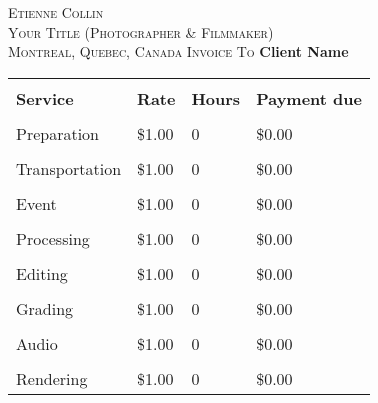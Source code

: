 \documentclass[6pt]{letter}
\newcommand{\authorLocation}{Montreal, Quebec, Canada}
\newcommand{\authorName}{Etienne Collin}
\newcommand{\clientName}{Client Name}
\newcommand{\myTitle}{Your Title (Photographer \& Filmmaker)}
\begin{document}
\singlespacing
\large
\textsc{\authorName}\\
\textsc{\myTitle}\\
\textsc{\authorLocation}
\vspace{0.5cm}
\Large\textsc{Invoice To}
\huge\textbf{\clientName}\normalsize

\begin{tabularx}{\linewidth}{Y Y Y Y}
    \hhline{====}\\
    \large\bf{Service}  &   \large\bf{Rate} &   \large\bf{Hours}                        &   \large\bf{Payment due}  \\[6pt]
    \hhline{====}\\
    Preparation         &   \$1.00          &   0                                       &   \$0.00                  \\[6pt]
    \hline\\
    Transportation      &   \$1.00          &   0                                       &   \$0.00                  \\[6pt]
    \hline\\
    Event               &   \$1.00          &   0                                       &   \$0.00                  \\[6pt]
    \hline\\
    Processing          &   \$1.00          &   0                                       &   \$0.00                  \\[6pt]
    \hline\\
    Editing             &   \$1.00          &   0                                       &   \$0.00                  \\[6pt]
    \hline\\
    Grading             &   \$1.00          &   0                                       &   \$0.00                  \\[6pt]
    \hline\\
    Audio               &   \$1.00          &   0                                       &   \$0.00                  \\[6pt]
    \hline\\
    Rendering           &   \$1.00          &   0                                       &   \$0.00                  \\[6pt]

\end{tabularx}
\end{document}
